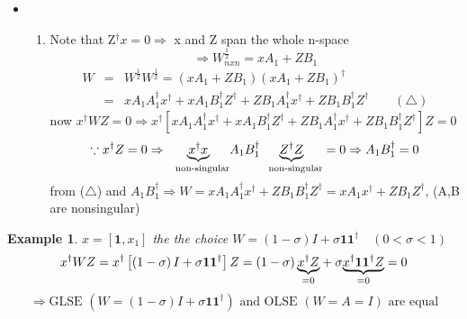 \documentclass{article}
\newtheorem{example}[theorem]{Example}
\begin{document}
\begin{itemize}
\item 
\begin{enumerate}
\item Note that Z$^{\dagger }x=0\Rightarrow $ x and Z span the whole n-space%
\begin{equation*}
\Rightarrow W_{nxn}^{\frac{1}{2}}=xA_{1}+ZB_{1}
\end{equation*}%
\begin{eqnarray*}
W &=&W^{\frac{1}{2}}W^{\frac{1}{2}}=\left( xA_{1}+ZB_{1}\right) \left(
xA_{1}+ZB_{1}\right) ^{\dagger } \\
&=&xA_{1}A_{1}^{\dagger }x^{\dagger }+xA_{1}B_{1}^{\dagger }Z^{\dagger
}+ZB_{1}A_{1}^{\dagger }x^{\dagger }+ZB_{1}B_{1}^{\dagger }Z^{\dagger
}\qquad \left( \triangle \right)
\end{eqnarray*}%
now $x^{\dagger }WZ=0\Rightarrow x^{\dagger }\left[ xA_{1}A_{1}^{\dagger
}x^{\dagger }+xA_{1}B_{1}^{\dagger }Z^{\dagger }+ZB_{1}A_{1}^{\dagger
}x^{\dagger }+ZB_{1}B_{1}^{\dagger }Z^{\dagger }\right] Z=0$%
\begin{equation*}
\because x^{\dagger }Z=0\Rightarrow \underset{\text{non-singular}}{%
\underbrace{x^{\dagger }x}}A_{1}B_{1}^{\dagger }\underset{\text{non-singular}%
}{\underbrace{Z^{\dagger }Z}}=0\Rightarrow A_{1}B_{1}^{\dagger }=0
\end{equation*}%
from ($\triangle $) and $A_{1}B_{1}^{\dagger }\Rightarrow
W=xA_{1}A_{1}^{\dagger }x^{\dagger }+ZB_{1}B_{1}^{\dagger }Z^{\dagger
}=xA_{1}x^{\dagger }+ZB_{1}Z^{\dagger }$, (A,B are nonsingular)
\end{enumerate}
\end{itemize}

\bigskip

\begin{example}
$x=\left[ \boldsymbol{1},x_{1}\right] $ the the choice $W=\left( 1-\sigma
\right) I+\sigma \boldsymbol{11}^{\dagger }\quad \left( 0<\sigma <1\right) $%
\begin{equation*}
x^{\dagger }WZ=x^{\dagger }\left[ \left( 1-\sigma \right) I+\sigma 
\boldsymbol{11}^{\dagger }\right] Z=\left( 1-\sigma \right) \underset{=0}{%
\underbrace{x^{\dagger }Z}}+\sigma \underset{=0}{\underbrace{x^{\dagger }%
\boldsymbol{11}^{\dagger }Z}}=0
\end{equation*}%
\begin{equation*}
\Rightarrow \text{GLSE }\left( W=\left( 1-\sigma \right) I+\sigma 
\boldsymbol{11}^{\dagger }\right) \text{ and OLSE }(W=A=I)\text{ are equal}
\end{equation*}
\end{example}
\end{document}
